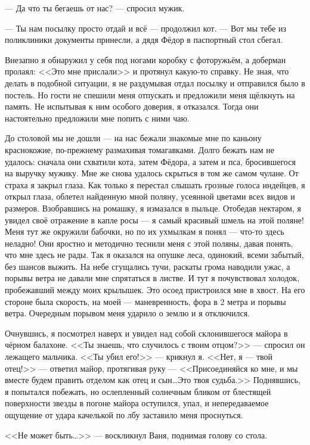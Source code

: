 --- Да что ты бегаешь от нас? --- спросил мужик.

--- Ты нам посылку просто отдай и всё --- продолжил кот. --- Вот мы тебе из поликлиники документы принесли, а дядя Фёдор в паспортный стол сбегал.

Внезапно я обнаружил у себя под ногами коробку с фоторужьём, а доберман пролаял: <<Это мне прислали>> и протянул какую-то справку. Не зная, что делать в подобной ситуации, я не раздумывая отдал посылку и отправился было в постель. Но гости не спешили меня отпускать и предложили меня щёлкнуть на память. Не испытывая к ним особого доверия, я отказался. Тогда они настоятельно предложили мне попить с ними чаю.

До столовой мы не дошли --- на нас бежали знакомые мне по каньону краснокожие, по-прежнему размахивая томагавками. Долго бежать нам не удалось: сначала они схватили кота, затем Фёдора, а затем и пса, бросившегося на выручку мужику. Мне же снова удалось скрыться в том же самом чулане. От страха я закрыл глаза. Как только я перестал слышать грозные голоса индейцев, я открыл глаза, облетел найденную мной поляну, усеянной цветами всех видов и размеров. Взобравшись на ромашку, я измазался в пыльце. Отобедав нектаром, я увидел своё отражение в капле росы --- я самый красивый шмель на этой поляне! Меня тут же окружили бабочки, но по их ухмылкам я понял --- что-то здесь неладно! Они яростно и методично теснили меня с этой поляны, давая понять, что мне здесь не рады. Так я оказался на опушке леса, одинокий, всеми забытый, без шансов выжить. На небе сгущались тучи, раскаты грома наводили ужас, а порывы ветра не давали мне спрятаться в листве. И тут я почувствовал холодок, пробежавший между моих крылышек. Это осоед пристроился мне в хвост. На его стороне была скорость, на моей --- маневренность, фора в 2 метра и порывы ветра. Очередным порывом меня ударило о землю и я отключился.

Очнувшись, я посмотрел наверх и увидел над собой склонившегося майора в чёрном балахоне. <<Ты знаешь, что случилось с твоим отцом?>> --- спросил он лежащего мальчика. <<Ты убил его!>> --- крикнул я. <<Нет, я --- твой отец!>> --- ответил майор, протягивая руку --- <<Присоединяйся ко мне, и мы вместе будем править отделом как отец и сын\ldots Это твоя судьба.>> Поднявшись, я попытался побежать, но ослепленный солнечным бликом от блестящей поверхности звезды в погоне майора оступился, упал, и непередаваемое ощущение от удара качелькой по лбу заставило меня проснуться.

<<Не может быть\ldots>> --- воскликнул Ваня, поднимая голову со стола.

